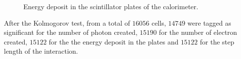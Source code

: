 \begin{figure}[htb!]

  \caption{Energy deposit in the scintillator plates of the calorimeter.}\label{fig:step-lengt-scintillator}

\end{figure}

After the Kolmogorov test, from a total of \(16056\) cells, \(14749\) were
tagged as significant for the number of photon created, \(15190\) for the
number of electron created, \(15122\) for the the energy deposit in the plates
and \(15122\) for the step length of the interaction.


